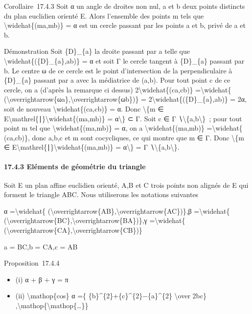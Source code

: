\documentclass[]{article}
\begin{document}
Corollaire~17.4.3 Soit α un angle de droites non nul, a et b deux points
distincts du plan euclidien orienté E. Alors l'ensemble des points m
tels que \textbackslash{}widehat\{(ma,mb)\} = α est un cercle passant
par les points a et b, privé de a et b.

Démonstration Soit \{D\}\_\{a\} la droite passant par a telle que
\textbackslash{}widehat\{(\{D\}\_\{a\},ab)\} = α et soit Γ le cercle
tangent à \{D\}\_\{a\} passant par b. Le centre ω de ce cercle est le
point d'intersection de la perpendiculaire à \{D\}\_\{a\} passant par a
avec la médiatrice de (a,b). Pour tout point c de ce cercle, on a
(d'après la remarque ci dessus) 2\textbackslash{}widehat\{(ca,cb)\}
=\textbackslash{}widehat\{
(\textbackslash{}overrightarrow\{ωa\},\textbackslash{}overrightarrow\{ωb\})\}
= 2\textbackslash{}widehat\{(\{D\}\_\{a\},ab)\} = 2α, soit de nouveau
\textbackslash{}widehat\{(ca,cb)\} = α. Donc \textbackslash{}\{m ∈
E\textbackslash{}mathrel\{∣\}\textbackslash{}widehat\{(ma,mb)\} =
α\textbackslash{}\} ⊂ Γ. Soit c ∈ Γ
∖\textbackslash{}\{a,b\textbackslash{}\}~; pour tout point m tel que
\textbackslash{}widehat\{(ma,mb)\} = α, on a
\textbackslash{}widehat\{(ma,mb)\} =\textbackslash{}widehat\{ (ca,cb)\},
donc a,b,c et m sont cocycliques, ce qui montre que m ∈ Γ. Donc
\textbackslash{}\{m ∈
E\textbackslash{}mathrel\{∣\}\textbackslash{}widehat\{(ma,mb)\} =
α\textbackslash{}\} = Γ ∖\textbackslash{}\{a,b\textbackslash{}\}.

\paragraph{17.4.3 Eléments de géométrie du triangle}

Soit E un plan affine euclidien orienté, A,B et C trois points non
alignés de E qui forment le triangle ABC. Nous utiliserons les notations
suivantes

α =\textbackslash{}widehat\{
(\textbackslash{}overrightarrow\{AB\},\textbackslash{}overrightarrow\{AC\})\},β
=\textbackslash{}widehat\{
(\textbackslash{}overrightarrow\{BC\},\textbackslash{}overrightarrow\{BA\})\},γ
=\textbackslash{}widehat\{
(\textbackslash{}overrightarrow\{CA\},\textbackslash{}overrightarrow\{CB\})\}

a = BC,b = CA,c = AB

Proposition~17.4.4

\begin{itemize}
\itemsep1pt\parskip0pt
\item
  (i) α + β + γ = π
\item
  (ii) \textbackslash{}mathop\{cos\} α =\{
  \{b\}\^{}\{2\}+\{c\}\^{}\{2\}−\{a\}\^{}\{2\} \textbackslash{}over
  2bc\} ,\textbackslash{}mathop\{\textbackslash{}mathop\{\ldots{}\}\}
\end{itemize}
\end{document}

